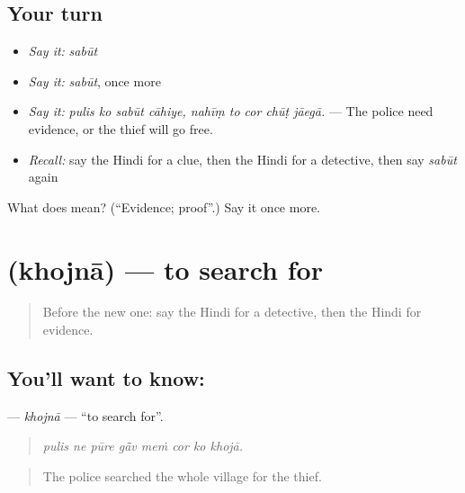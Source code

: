 \subsection*{Your turn}
\begin{itemize}
\raggedright
  \item \emph{Say it:} \emph{sabūt}
  \item \emph{Say it:} \emph{sabūt}, once more
  \item \emph{Say it:} \emph{pulis ko sabūt cāhiye, nahīṃ to cor chūṭ jāegā.} — The police need evidence, or the thief will go free.
  \item \emph{Recall:} say the Hindi for a clue, then the Hindi for a detective, then say \emph{sabūt} again
\end{itemize}

\begin{tcolorbox}[breakable,colback=teal!4,colframe=teal!35!black,title={Before you move on}]
What does  mean? (\textquotedblleft{}Evidence; proof\textquotedblright{}.) Say it once more.
\end{tcolorbox}
\section[\texorpdfstring{\hi{खोजना} (khojnā)}{खोजना (khojnā)}]{ (khojnā) — to search for}

\label{lesson:HI-C294-khojna}



\begin{quote}
Before the new one: say the Hindi for a detective, then the Hindi for evidence.
\end{quote}

\subsection*{You'll want to know: }
\textbf{} — \emph{khojnā} — \textquotedblleft{}to search for\textquotedblright{}.

\begin{quote}
       
\end{quote}

\begin{quote}
\emph{pulis ne pūre gā̃v meṁ cor ko khojā.}
\end{quote}

\begin{quote}
The police searched the whole village for the thief.
\end{quote}

